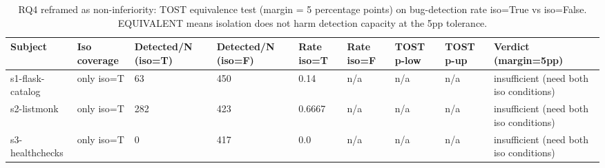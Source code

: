 \begin{table}[t]
\centering
\caption{RQ4 reframed as non-inferiority: TOST equivalence test (margin = 5 percentage points) on bug-detection rate iso=True vs iso=False. EQUIVALENT means isolation does not harm detection capacity at the 5pp tolerance.}
\label{tab:T1_rq4_noninferiority}
\begin{tabular}{lllllllll}
\hline
Subject & Iso coverage & Detected/N (iso=T) & Detected/N (iso=F) & Rate iso=T & Rate iso=F & TOST p-low & TOST p-up & Verdict (margin=5pp) \\
\hline
s1-flask-catalog & only iso=T & 63 & 450 & 0.14 & n/a & n/a & n/a & insufficient (need both iso conditions) \\
s2-listmonk & only iso=T & 282 & 423 & 0.6667 & n/a & n/a & n/a & insufficient (need both iso conditions) \\
s3-healthchecks & only iso=T & 0 & 417 & 0.0 & n/a & n/a & n/a & insufficient (need both iso conditions) \\
\hline
\end{tabular}
\end{table}
